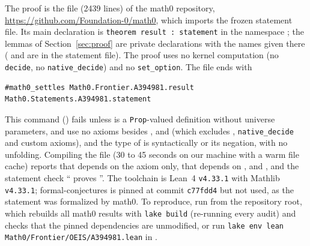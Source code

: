 \documentclass[11pt]{amsart}
\theoremstyle{plain}
\theoremstyle{definition}
\newcommand{\code}[1]{\texttt{#1}}
\begin{document}
The proof is the file  (2439 lines) of the math0 repository, \url{https://github.com/Foundation-0/math0}, which imports the frozen statement file. Its main declaration is \code{theorem result : statement} in the namespace ; the lemmas of Section~\ref{sec:proof} are private declarations with the names given there ( and  are in the statement file). The proof uses no kernel computation (no \texttt{decide}, no \texttt{native\_decide}) and no \texttt{set\_option}. The file ends with
\begin{lstlisting}[basicstyle=\ttfamily\scriptsize]
#math0_settles Math0.Frontier.A394981.result Math0.Statements.A394981.statement
\end{lstlisting}
This command () fails unless  is a \texttt{Prop}-valued definition without universe parameters,  and  use no axioms besides ,  and  (which excludes , \texttt{native\_decide} and custom axioms), and the type of  is syntactically  or its negation, with no unfolding. Compiling the file (30 to 45 seconds on our machine with a warm file cache) reports that  depends on the axiom  only, that  depends on ,  and , and the statement check `` proves ''.
The toolchain is Lean~4 \cite{Lean4} \texttt{v4.33.1} with Mathlib \cite{Mathlib} \texttt{v4.33.1}; formal-conjectures \cite{FC} is pinned at commit \texttt{c77fdd4} but not used, as the statement was formalized by math0. To reproduce, run  from the repository root, which rebuilds all math0 results with \texttt{lake build} (re-running every audit) and checks that the pinned dependencies are unmodified, or run \texttt{lake env lean Math0/Frontier/OEIS/A394981.lean} in .
\end{document}
